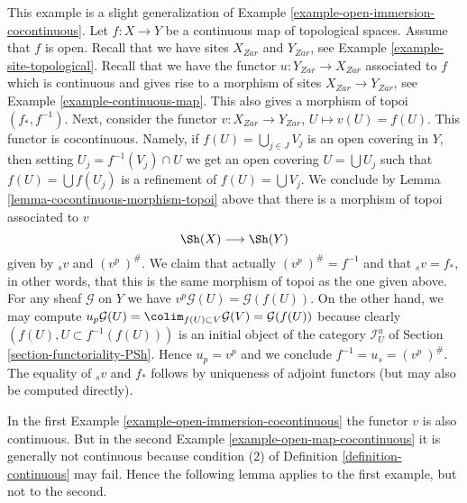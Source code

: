 \begin{example}
\label{example-open-map-cocontinuous}
This example is a slight generalization of
Example \ref{example-open-immersion-cocontinuous}.
Let $f : X \to Y$ be a continuous map of topological spaces.
Assume that $f$ is open.
Recall that we have sites $X_{Zar}$ and $Y_{Zar}$,
see Example \ref{example-site-topological}.
Recall that we have the functor $u : Y_{Zar} \to X_{Zar}$
associated to $f$ which is continuous and gives rise
to a morphism of sites $X_{Zar} \to Y_{Zar}$,
see Example \ref{example-continuous-map}.
This also gives a morphism of topoi $(f_*, f^{-1})$.
Next, consider the functor
$v : X_{Zar} \to Y_{Zar}$, $U \mapsto v(U) = f(U)$.
This functor is cocontinuous. Namely, if $f(U) = \bigcup_{j \in J} V_j$
is an open covering in $Y$, then setting $U_j = f^{-1}(V_j) \cap U$
we get an open covering $U = \bigcup U_j$ such that $f(U) = \bigcup f(U_j)$
is a refinement of $f(U) = \bigcup V_j$.
We conclude by Lemma \ref{lemma-cocontinuous-morphism-topoi} above
that there is a morphism of topoi associated to $v$
$$
\Sh(X) \longrightarrow \Sh(Y)
$$
given by ${}_sv$ and $(v^p\ )^\#$. We claim that
actually $(v^p\ )^\# = f^{-1}$ and that ${}_sv = f_*$,
in other words, that this is the same morphism of topoi
as the one given above. For any sheaf
$\mathcal{G}$ on $Y$ we have
$v^p\mathcal{G}(U) = \mathcal{G}(f(U))$.
On the other hand, we may compute
$u_p\mathcal{G}(U) = \colim_{f(U) \subset V} \mathcal{G}(V)
= \mathcal{G}(f(U))$ because clearly $(f(U), U \subset f^{-1}(f(U)))$
is an initial object of the category $\mathcal{I}_U^u$ of
Section \ref{section-functoriality-PSh}.
Hence $u_p = v^p$ and we conclude $f^{-1} = u_s = (v^p\ )^\#$.
The equality of ${}_sv$ and $f_*$ follows by
uniqueness of adjoint functors (but may also be computed directly).
\end{example}

\noindent
In the first Example \ref{example-open-immersion-cocontinuous}
the functor $v$ is also continuous. But in the second
Example \ref{example-open-map-cocontinuous} it is generally not continuous
because condition (2) of Definition \ref{definition-continuous} may fail.
Hence the following lemma applies to the first example, but not to the second.

